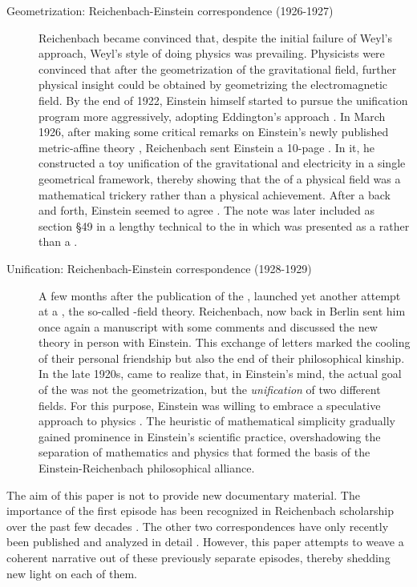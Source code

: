 \documentclass[final]{article}
\newcommand{\PRZL}{\citetitle{Reichenbach1928}\xspace}
\newcommand{\FP}{\german{Fernparallelismus}\xspace}
\begin{document}
\begin{description}
\item[Geometrization: Reichenbach-Einstein correspondence (1926-1927)]\label{reichenbacheinsteinI} Reichenbach became convinced that, despite the initial failure of Weyl's approach, Weyl's style of doing physics was prevailing. Physicists were convinced that after the geometrization of the gravitational field, further physical insight could be obtained by geometrizing the electromagnetic field. By the end of 1922, Einstein himself started to pursue the unification program more aggressively, adopting Eddington's approach \citep{Einstein1923}. In March 1926, after making some critical remarks on Einstein's newly published metric-affine theory \citep{Einstein1925a}, Reichenbach sent Einstein a 10-page  \citep{Reichenbach1926f}. In it, he constructed a toy unification of the gravitational and electricity in a single geometrical framework, thereby showing that the  of a physical field was a mathematical trickery rather than a physical achievement. After a back and forth, Einstein seemed to agree \citep{Lehmkuhl2014}. The note was later included as section \S49 in a lengthy technical \Ap to the \PRZL \citep[-50]{Reichenbach1928} in which \gr was presented as a  rather than a  \citep{Giovanelli2020}. 

\item[Unification: Reichenbach-Einstein correspondence (1928-1929)]\label{reichenbacheinsteinII}  A few months after the publication of the \PRZL \citep{Reichenbach1928}, \citet{Einstein19281,Einstein19282} launched yet another attempt at a \uft, the so-called \FP-field theory. Reichenbach, now back in Berlin sent him once again a manuscript with some comments \citep{Reichenbach1928b} and discussed the new theory in person with Einstein. This exchange of letters marked the cooling of their personal friendship but also the end of their philosophical kinship. In the late 1920s, \citet{Reichenbach1929a,Reichenbach1929b,Reichenbach1929c} came to realize that, in Einstein's mind, the actual goal of the \uftp was not the geometrization, but the \emph{unification} of two different fields. For this purpose, Einstein was willing to embrace a speculative approach to physics \citep{Dongen2010}. The heuristic of mathematical simplicity gradually gained prominence in Einstein's scientific practice, overshadowing the separation of mathematics and physics that formed the basis of the Einstein-Reichenbach philosophical alliance.
\end{description}
The aim of this paper is not to provide new documentary material. The importance of the first episode has been recognized in Reichenbach scholarship over the past few decades \citep{Ryckman1995,Ryckman1996}. The other two correspondences have only recently been published and analyzed in detail \citep{Giovanelli2016d,Giovanelli2022}. However, this paper attempts to weave a coherent narrative out of these previously separate episodes, thereby shedding new light on each of them.
\end{document}
